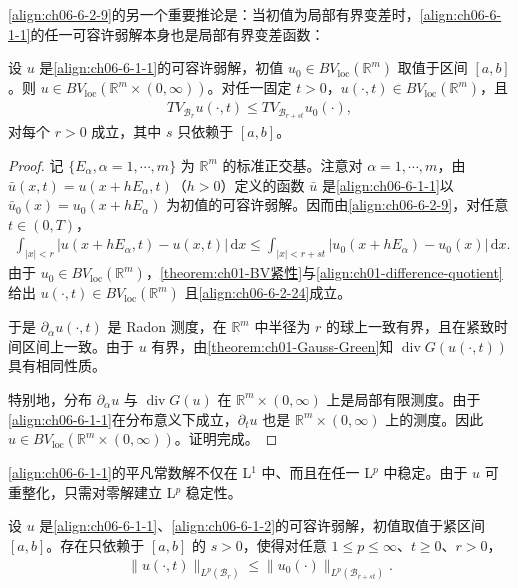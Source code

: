 \documentclass[../../main.tex]{subfiles}
\begin{document}
\eqref{align:ch06-6-2-9}的另一个重要推论是：当初值为局部有界变差时，\eqref{align:ch06-6-1-1}的任一可容许弱解本身也是局部有界变差函数：

\begin{theorem}\label{theorem:ch06-6-2-6}
设 $u$ 是\eqref{align:ch06-6-1-1}的可容许弱解，初值 $u_{0}\in BV_{\mathrm{loc}}(\mathbb{R}^{m})$ 取值于区间 $[a,b]$。则 $u\in BV_{\mathrm{loc}}(\mathbb{R}^{m}\times(0,\infty))$。对任一固定 $t>0$，$u(\cdot,t)\in BV_{\mathrm{loc}}(\mathbb{R}^{m})$，且
\begin{align}
TV_{\mathscr{B}_{r}}u(\cdot,t)\leqslant TV_{\mathscr{B}_{r+st}}u_{0}(\cdot),
\label{align:ch06-6-2-24}
\end{align}
对每个 $r>0$ 成立，其中 $s$ 只依赖于 $[a,b]$。
\end{theorem}

\begin{proof}
记 $\{E_{\alpha},\alpha=1,\cdots,m\}$ 为 $\mathbb{R}^{m}$ 的标准正交基。注意对 $\alpha=1,\cdots,m$，由 $\bar{u}(x,t)=u(x+hE_{\alpha},t)$（$h>0$）定义的函数 $\bar{u}$ 是\eqref{align:ch06-6-1-1}以 $\bar{u}_{0}(x)=u_{0}(x+hE_{\alpha})$ 为初值的可容许弱解。因而由\eqref{align:ch06-6-2-9}，对任意 $t\in(0,T)$，
\begin{align}
\int_{|x|<r}|u(x+hE_{\alpha},t)-u(x,t)|\,\mathrm{d}x\leqslant\int_{|x|<r+st}|u_{0}(x+hE_{\alpha})-u_{0}(x)|\,\mathrm{d}x.
\label{align:ch06-6-2-25}
\end{align}
由于 $u_{0}\in BV_{\mathrm{loc}}(\mathbb{R}^{m})$，\cref{theorem:ch01-BV紧性}与\eqref{align:ch01-difference-quotient}给出 $u(\cdot,t)\in BV_{\mathrm{loc}}(\mathbb{R}^{m})$ 且\eqref{align:ch06-6-2-24}成立。


于是 $\partial_{\alpha}u(\cdot,t)$ 是 Radon 测度，在 $\mathbb{R}^{m}$ 中半径为 $r$ 的球上一致有界，且在紧致时间区间上一致。由于 $u$ 有界，由\cref{theorem:ch01-Gauss-Green}知 $\operatorname{div}G(u(\cdot,t))$ 具有相同性质。

特别地，分布 $\partial_{\alpha}u$ 与 $\operatorname{div}G(u)$ 在 $\mathbb{R}^{m}\times(0,\infty)$ 上是局部有限测度。由于\eqref{align:ch06-6-1-1}在分布意义下成立，$\partial_{t}u$ 也是 $\mathbb{R}^{m}\times(0,\infty)$ 上的测度。因此 $u\in BV_{\mathrm{loc}}(\mathbb{R}^{m}\times(0,\infty))$。证明完成。
\end{proof}

\eqref{align:ch06-6-1-1}的平凡常数解不仅在 L$^{1}$ 中、而且在任一 L$^{p}$ 中稳定。由于 $u$ 可重整化，只需对零解建立 L$^{p}$ 稳定性。

\begin{theorem}\label{theorem:ch06-6-2-7}
设 $u$ 是\eqref{align:ch06-6-1-1}、\eqref{align:ch06-6-1-2}的可容许弱解，初值取值于紧区间 $[a,b]$。存在只依赖于 $[a,b]$ 的 $s>0$，使得对任意 $1\leqslant p\leqslant\infty$、$t\geqslant 0$、$r>0$，
\begin{align}
\|u(\cdot,t)\|_{L^{p}(\mathscr{B}_{r})}\leqslant\|u_{0}(\cdot)\|_{L^{p}(\mathscr{B}_{r+st})}.
\label{align:ch06-6-2-26}
\end{align}
\end{theorem}
\end{document}
